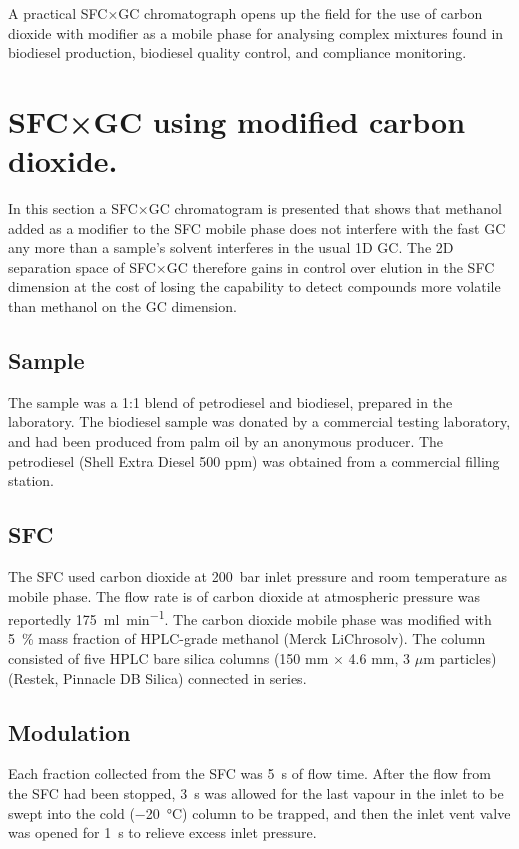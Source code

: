 A practical SFC×GC chromatograph opens up the field for the use of carbon
dioxide with modifier as a mobile phase for analysing complex mixtures found in
biodiesel production, biodiesel quality control, and compliance monitoring.

\section[SFC×GC with modifier]{SFC×GC using modified carbon dioxide.}

In this section a SFC×GC chromatogram is presented that shows that methanol
added as a modifier to the SFC mobile phase does not interfere with the fast GC
any more than a sample's solvent interferes in the usual 1D GC. The 2D
separation space of SFC×GC therefore gains in control over elution in the SFC
dimension at the cost of losing the capability to detect compounds
more volatile than methanol on the GC dimension.

\subsection{Sample}

The sample was a 1:1 blend of petrodiesel and biodiesel, prepared in the
laboratory. The biodiesel sample was donated by a commercial testing laboratory,
and had been produced from palm oil by an anonymous producer. The petrodiesel
(Shell Extra Diesel 500 ppm) was obtained from a commercial filling station.

\subsection{SFC}

The SFC used carbon dioxide at \SI{200}{\bar} inlet pressure and room
temperature as mobile phase. The flow rate is of carbon dioxide at atmospheric
pressure was reportedly \SI{175}{\milli\litre\per\minute}. The carbon dioxide
mobile phase was modified with \SI{5}{\percent} mass fraction of HPLC-grade
methanol (Merck LiChrosolv). The column consisted of five HPLC bare silica
columns (150 mm $\times$ 4.6 mm, 3 $\mu$m particles) (Restek, Pinnacle DB
Silica) connected in series.

\subsection{Modulation}

Each fraction collected from the SFC was \SI{5}{\second} of flow time. After the
flow from the SFC had been stopped, \SI{3}{\second} was allowed for the last
vapour in the inlet to be swept into the cold (\SI{-20}{\celsius}) column to be
trapped, and then the inlet vent valve was opened for \SI{1}{\second} to relieve
excess inlet pressure.

